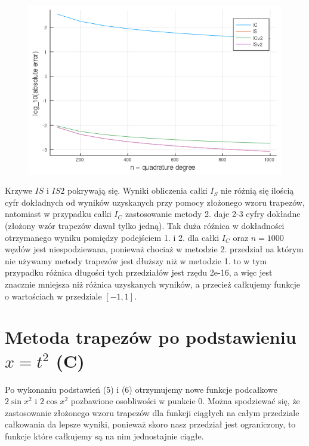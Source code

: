 \documentclass{article}
\begin{document}
\begin{figure}[ht]
    \includegraphics[scale=0.5]{WykresBlogabsolute.png}
    \label{wykresB}
\end{figure}

Krzywe $IS$ i $IS2$ pokrywają się. Wyniki obliczenia całki $I_S$ nie różnią się ilością cyfr dokładnych od wyników uzyskanych przy pomocy złożonego wzoru trapezów, natomiast w przypadku całki $I_C$ zastosowanie metody 2. daje 2-3 cyfry dokładne (złożony wzór trapezów dawał tylko jedną). Tak duża róźnica w dokładności otrzymanego wyniku pomiędzy podejściem 1. i 2. dla całki $I_C$ oraz $n=1000$ węzłów jest niespodziewana, ponieważ chociaż w metodzie 2. przedział na którym nie używamy metody trapezów jest dłuższy niż w metodzie 1. to w tym przypadku różnica długości tych przedziałów jest rzędu 2e-16, a więc jest znacznie mniejsza niż różnica uzyskanych wyników, a przecież całkujemy funkcje o wartościach w przedziale $[-1,1]$.

\section*{Metoda trapezów po podstawieniu $x=t^2$ (C)}
Po wykonaniu podstawień (5) i (6) otrzymujemy nowe funkcje podcałkowe $2\sin{x^2}$ i $2\cos{x^2}$ pozbawione osobliwości w punkcie 0. Można spodziewać się, że zastosowanie złożonego wzoru trapezów dla funkcji ciągłych na całym przedziale całkowania da lepsze wyniki, ponieważ skoro nasz przedział jest ograniczony, to funkcje które całkujemy są na nim jednostajnie ciągłe.

\newpage
\end{document}
